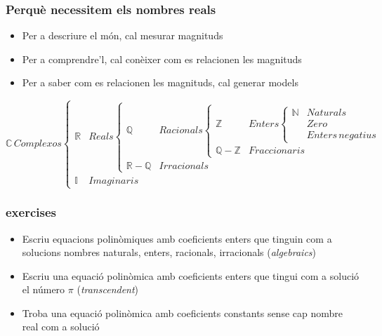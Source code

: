 \documentclass{beamer}
\begin{document}
\begin{frame}
\frametitle{Perquè necessitem els nombres reals}
\begin{itemize}
  \item Per a descriure el món, cal mesurar magnituds
  \item Per a comprendre'l, cal conèixer com es relacionen les magnituds
  \item Per a saber com es relacionen les magnituds, cal generar models
\end{itemize}
\footnotesize
\begin{equation}
  \mathbb{C} \, Complexos
      \begin{cases}
        \mathbb{R} & Reals
        \begin{cases}
          \mathbb{Q} & Racionals
          \begin{cases}
            \mathbb{Z} & Enters
            \begin{cases}
              \mathbb{N} & Naturals \\
               & Zero \\
               & Enters \, negatius
            \end{cases}
            \\
            \mathbb{Q}-\mathbb{Z} & Fraccionaris
          \end{cases}
          \\
          \mathbb{R}-\mathbb{Q} & Irracionals
        \end{cases}
        \\
        \mathbb{I} & Imaginaris
      \end{cases}
\end{equation}
\normalsize
\end{frame}


\begin{frame}
\frametitle{exercises}
\begin{itemize}
\item Escriu equacions polinòmiques amb coeficients enters que tinguin com a solucions nombres naturals, enters, racionals, irracionals (\textit{algebraics})
\item Escriu una equació polinòmica amb coeficients enters que tingui com a solució el número $\pi$ (\textit{transcendent})
\item Troba una equació polinòmica amb coeficients constants sense cap nombre real com a  solució
\end{itemize}
\end{frame}
\end{document}
